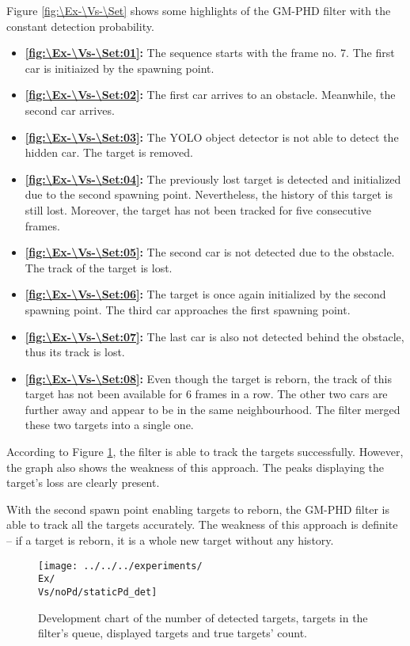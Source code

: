 Figure \ref{fig:\Ex-\Vs-\Set} shows some highlights of the GM-PHD filter with the constant detection probability.
\begin{itemize}
    \item \textbf{\ref{fig:\Ex-\Vs-\Set:01}:} The sequence starts with the frame no. 7. The first car is initiaized by
    the spawning point.
    \item \textbf{\ref{fig:\Ex-\Vs-\Set:02}:} The first car arrives to an obstacle. Meanwhile, the second car arrives.
    \item \textbf{\ref{fig:\Ex-\Vs-\Set:03}:} The YOLO object detector is not able to detect the hidden car. The target is removed.
    \item \textbf{\ref{fig:\Ex-\Vs-\Set:04}:} The previously lost target is detected and initialized due to the
    second spawning point. Nevertheless, the history of this target is still lost. Moreover, the target has not been tracked for five consecutive frames.
    \item \textbf{\ref{fig:\Ex-\Vs-\Set:05}:} The second car is not detected due to the obstacle. The track of the target is lost.
    \item \textbf{\ref{fig:\Ex-\Vs-\Set:06}:} The target is once again initialized by the second spawning point. The
    third car approaches the first spawning point.
    \item \textbf{\ref{fig:\Ex-\Vs-\Set:07}:} The last car is also not detected behind the obstacle, thus its track is lost.
    \item \textbf{\ref{fig:\Ex-\Vs-\Set:08}:} Even though the target is reborn, the track of this target has not been
    available for 6 frames in a row. The other two cars are further away and appear to be in the same neighbourhood.
    The filter merged these two targets into a single one.
\end{itemize}

According to Figure \ref{gr:\Ex-\Vs-\Set}, the filter is able to track the targets successfully. However, the graph also
shows the weakness of this approach. The peaks displaying the target's loss are clearly present.

With the second spawn point enabling targets to reborn, the GM-PHD filter is able to track all the targets accurately.
The weakness of this approach is definite -- if a target is reborn, it is a whole new target without any history.

\begin{figure}[H]
    \centering
    \texttt{[image: ../../../experiments/\\Ex/\\Vs/noPd/staticPd\_det]}
    \caption{Development chart of the number of detected targets, targets in the filter's queue, displayed targets and
    true targets' count.}
    \label{gr:\Ex-\Vs-\Set}
\end{figure}

